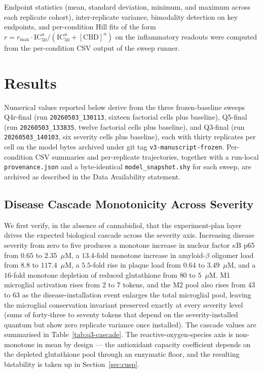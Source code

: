 \documentclass[10pt,letterpaper]{article}
\begin{document}
Endpoint statistics (mean, standard deviation, minimum, and maximum across each replicate cohort), inter-replicate variance, bimodality detection on key endpoints, and per-condition Hill fits of the form $r = r_{\max} \cdot \text{IC}_{50}^n / (\text{IC}_{50}^n + [\text{CBD}]^n)$ on the inflammatory readouts were computed from the per-condition CSV output of the sweep runner.

\section{Results}
\label{sec:results}

Numerical values reported below derive from the three frozen-baseline sweeps Q4r-final (run \texttt{20260503\_130113}, sixteen factorial cells plus baseline), Q5-final (run \texttt{20260503\_133835}, twelve factorial cells plus baseline), and Q3-final (run \texttt{20260503\_140103}, six severity cells plus baseline), each with thirty replicates per cell on the model bytes archived under git tag \texttt{v3-manuscript-frozen}. Per-condition CSV summaries and per-replicate trajectories, together with a run-local \texttt{provenance.json} and a byte-identical \texttt{model\_snapshot.shy} for each sweep, are archived as described in the Data Availability statement.

\subsection{Disease Cascade Monotonicity Across Severity}
\label{sec:r-q3}

We first verify, in the absence of cannabidiol, that the experiment-plan layer drives the expected biological cascade across the severity axis. Increasing disease severity from zero to five produces a monotone increase in nuclear factor $\kappa$B p65 from $0.65$ to $2.35$~$\mu$M, a $13.4$-fold monotone increase in amyloid-$\beta$ oligomer load from $8.8$ to $117.4$~$\mu$M, a $5.5$-fold rise in plaque load from $0.64$ to $3.49$~$\mu$M, and a $16$-fold monotone depletion of reduced glutathione from $80$ to $5$~$\mu$M. M1 microglial activation rises from $2$ to $7$ tokens, and the M2 pool also rises from $43$ to $63$ as the disease-installation event enlarges the total microglial pool, leaving the microglial conservation invariant preserved exactly at every severity level (sums of forty-three to seventy tokens that depend on the severity-installed quantum but show zero replicate variance once installed). The cascade values are summarised in Table~\ref{tab:q3-cascade}. The reactive-oxygen-species axis is non-monotone in mean by design --- the antioxidant capacity coefficient depends on the depleted glutathione pool through an enzymatic floor, and the resulting bistability is taken up in Section~\ref{sec:cusp}.
\end{document}
